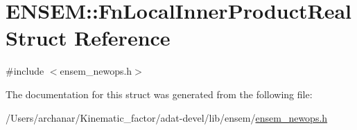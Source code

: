 \hypertarget{structENSEM_1_1FnLocalInnerProductReal}{}\section{E\+N\+S\+EM\+:\+:Fn\+Local\+Inner\+Product\+Real Struct Reference}
\label{structENSEM_1_1FnLocalInnerProductReal}


{\ttfamily \#include $<$ensem\+\_\+newops.\+h$>$}



The documentation for this struct was generated from the following file\+:\begin{DoxyCompactItemize}
\item 
/\+Users/archanar/\+Kinematic\+\_\+factor/adat-\/devel/lib/ensem/\mbox{\hyperlink{adat-devel_2lib_2ensem_2ensem__newops_8h}{ensem\+\_\+newops.\+h}}\end{DoxyCompactItemize}
